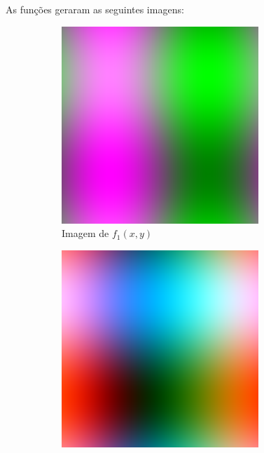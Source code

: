 \documentclass[12pt, a4paper]{article}
\begin{document}
    \newpage
    As funções geraram as seguintes imagens:
    \begin{figure}[h]
        \begin{subfigure}{.3\textwidth}
            \includegraphics[width=.95\textwidth]{../fstFun.png}
            \caption{Imagem de $f_1(x,y)$}
        \end{subfigure}
        \begin{subfigure}{.3\textwidth}
            \includegraphics[width=.95\textwidth]{../secFun.png}

\end{subfigure}
\end{figure}
\end{document}
